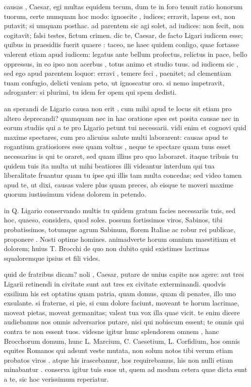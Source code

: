  causas , Caesar, egi multas equidem tecum, dum te in foro tenuit ratio honorum tuorum, certe numquam hoc modo: ignoscite , iudices; erravit, lapsus est, non putavit; si umquam posthac. ad parentem sic agi solet, ad iudices: non fecit, non cogitavit; falsi testes, fictum crimen. dic te, Caesar, de facto Ligari iudicem esse; quibus in praesidiis fuerit quaere : taceo, ne haec quidem conligo, quae fortasse valerent etiam apud iudicem: legatus ante bellum profectus, relictus in pace, bello oppressus, in eo ipso non acerbus , totus animo et studio tuus. ad iudicem sic , sed ego apud parentem loquor: erravi , temere feci , paenitet; ad clementiam tuam confugio, delicti veniam peto, ut ignoscatur oro. si nemo impetravit, adroganter: si plurimi, tu idem fer opem qui spem dedisti.

 an sperandi de Ligario causa non erit , cum mihi apud te locus sit etiam pro altero deprecandi? quamquam nec in hac oratione spes est posita causae nec in eorum studiis qui a te pro Ligario petunt tui necessarii. vidi enim et cognovi quid maxime spectares, cum pro alicuius salute multi laborarent: causas apud te rogantium gratiosiores esse quam voltus , neque te spectare quam tuus esset necessarius is qui te oraret, sed quam illius pro quo laboraret. itaque tribuis tu quidem tuis ita multa ut mihi beatiores illi videantur interdum qui tua liberalitate fruantur quam tu ipse qui illis tam multa concedas; sed video tamen apud te, ut dixi, causas valere plus quam preces, ab eisque te moveri maxime quorum iustissimum videas dolorem in petendo.

 in Q. Ligario conservando multis tu quidem gratum facies necessariis tuis, sed hoc, quaeso, considera, quod soles. possum fortissimos viros, Sabinos, tibi probatissimos, totumque agrum Sabinum, florem Italiae ac robur rei publicae, proponere . Nosti optime homines. animadverte horum omnium maestitiam et dolorem; huius T. Brocchi de quo non dubito quid existimes lacrimas squaloremque ipsius et fili vides.

 quid de fratribus dicam? noli , Caesar, putare de unius capite nos agere: aut tres Ligarii retinendi in civitate sunt aut tres ex civitate exterminandi. quodvis exsilium his est optatius quam patria, quam domus, quam di penates, illo uno exsulante. si fraterne, si pie, si cum dolore faciunt, moveant te horum lacrimae, moveat pietas, moveat germanitas; valeat tua vox illa quae vicit. te enim dicere audiebamus nos omnis adversarios putare, nisi qui nobiscum essent; te omnis qui contra te non essent tuos. videsne igitur hunc splendorem omnem , hanc Brocchorum domum, hunc L. Marcium, C. Caesetium, L. Corfidium, hos omnis equites Romanos qui adsunt veste mutata, non solum notos tibi verum etiam probatos viros . atque his irascebamur, hos requirebamus, his non nulli etiam minabantur . conserva igitur tuis suos ut, quem ad modum cetera quae dicta sunt a te, sic hoc verissimum reperiatur.

